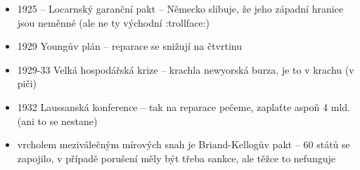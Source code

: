 \documentclass{article}
\begin{document}
\begin{itemize}
  \item 1925 -- Locarnský garanční pakt -- Německo slibuje, že jeho západní hranice jsou neměnné (ale ne ty východní :trollface:)
  \item 1929 Youngův plán -- reparace se snižují na čtvrtinu
  \item 1929-33 Velká hospodářská krize -- krachla newyorská burza, je to v krachu (v piči)
  \item 1932 Laussanská konference -- tak na reparace pečeme, zaplaťte aspoň 4 mld. (ani to se nestane)
  \item  vrcholem meziválečným mírových snah je Briand-Kellogův pakt -- 60 států se zapojilo, v případě porušení měly být třeba sankce, ale těžce to nefunguje
\end{itemize}
\end{document}
